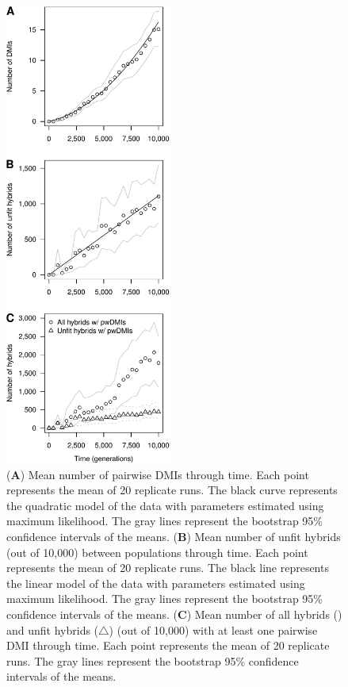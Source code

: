 \begin{doublespace}
\begin{figure}[p]
\begin{center}
\includegraphics[height=6in]{dmi-and-hybrids.pdf}
\end{center}
\caption{
  (\textbf{A}) Mean number of pairwise DMIs through time.
  Each point represents the mean of 20 replicate runs.
  The black curve represents the quadratic model of the data
  with parameters estimated using maximum likelihood.
  The gray lines represent the bootstrap 95\% confidence intervals of the means.
  (\textbf{B}) Mean number of unfit hybrids (out of 10,000)
  between populations through time.
  Each point represents the mean of 20 replicate runs.
  The black line represents the linear model of the data
  with parameters estimated using maximum likelihood.
  The gray lines represent the bootstrap 95\% confidence intervals of the means.
  (\textbf{C}) Mean number of all hybrids () %
  and unfit hybrids ($\triangle$) (out of 10,000)
  with at least one pairwise DMI through time.
  Each point represents the mean of 20 replicate runs.
  The gray lines represent the bootstrap 95\%
  confidence intervals of the means.}
\label{dmi-and-hybrids}
\end{figure}




\end{doublespace}

